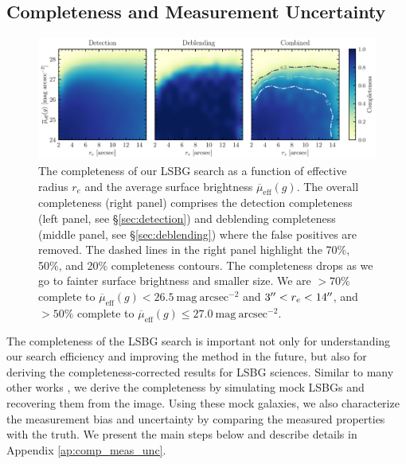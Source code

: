 \documentclass[twocolumn,astrosymb,twocolappendix]{aastex631}
\newcommand{\sbunit}{\mathrm{mag\ arcsec}^{-2}}
\newcommand{\sbeff}{\overline{\mu}_{\mathrm{eff}}(g)}
\newcommand{\jiaxuan}[1]{\textcolor{orange}{\textbf{Jiaxuan: #1}}}
\begin{document}
\begin{CJK*}{UTF8}{gbsn}

\subsection{Completeness and Measurement Uncertainty}\label{sec:comp_meas}
\begin{figure}
	\vbox{ 
		\centering
		\includegraphics[width=1\linewidth]{completeness.pdf}
	}
	\caption{The completeness of our LSBG search as a function of effective radius $r_e$ and the average surface brightness $\sbeff$. The overall completeness (right panel) comprises the detection completeness (left panel, see \S \ref{sec:detection}) and deblending completeness (middle panel, see \S \ref{sec:deblending}) where the false positives are removed. The dashed lines in the right panel highlight the 70\%, 50\%, and 20\% completeness contours. The completeness drops as we go to fainter surface brightness and smaller size. We are $>70\%$ complete to $\sbeff < 26.5\ \sbunit$ and $3\mbox{$^{\prime\prime}$} < r_e < 14\mbox{$^{\prime\prime}$}$, and $>50\%$ complete to $\sbeff \leqslant 27.0\ \sbunit$. 
	}
	\label{fig:completeness}
\end{figure}

The completeness of the LSBG search is important not only for understanding our search efficiency and improving the method in the future, but also for deriving the completeness-corrected results for LSBG sciences. Similar to many other works \citep[e.g.,][]{vdBurg2017,Zaritsky2021,CarlstenELVES2022,Greene2022}, we derive the completeness by simulating mock LSBGs and recovering them from the image. Using these mock galaxies, we also characterize the measurement bias and uncertainty by comparing the measured properties with the truth. We present the main steps below and describe details in Appendix \ref{ap:comp_meas_unc}.


\end{CJK*}
\end{document}
